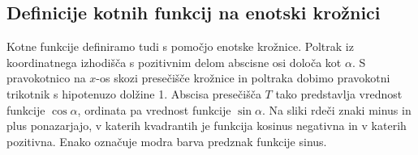 \subsection{Definicije kotnih funkcij na enotski krožnici}

Kotne funkcije definiramo tudi s pomočjo enotske krožnice. Poltrak iz koordinatnega izhodišča s pozitivnim delom abscisne osi določa kot $\alpha$. S pravokotnico na $x$-os skozi presečišče krožnice in poltraka dobimo pravokotni trikotnik s hipotenuzo dolžine 1. Abscisa presečišča $T$ tako predstavlja vrednost funkcije $\cos\alpha$, ordinata pa vrednost funkcije $\sin\alpha$. Na sliki rdeči znaki minus in plus ponazarjajo, v katerih kvadrantih je funkcija kosinus negativna in v katerih pozitivna. Enako označuje modra barva predznak funkcije sinus.

\

